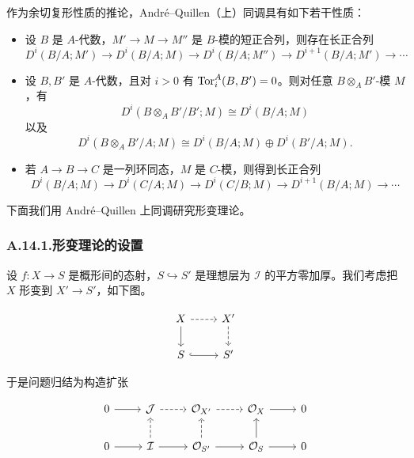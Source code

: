 %

作为余切复形性质的推论，André--Quillen（上）同调具有如下若干性质：

\begin{itemize}
\item 设 $B$ 是 $A$-代数，$M'\to M\to M''$ 是 $B$-模的短正合列，则存在长正合列
\[
D^i(B/A;M')\to D^i(B/A;M)\to D^i(B/A;M'')\to D^{i+1}(B/A;M')\to\cdots
\]
\item 设 $B,B'$ 是 $A$-代数，且对 $i>0$ 有 $\operatorname{Tor}_i^A(B,B')=0$。则对任意 $B\otimes_A B'$-模 $M$，有
\[
D^i(B\otimes_A B'/B';M)\cong D^i(B/A;M)
\]
以及
\[
D^i(B\otimes_A B'/A;M)\cong D^i(B/A;M)\oplus D^i(B'/A;M).
\]
\item 若 $A\to B\to C$ 是一列环同态，$M$ 是 $C$-模，则得到长正合列
\[
D^i(B/A;M)\to D^i(C/A;M)\to D^i(C/B;M)\to D^{i+1}(B/A;M)\to\cdots
\]
\end{itemize}

下面我们用 André--Quillen 上同调研究形变理论。

\subsubsection*{A.14.1.\quad 形变理论的设置}

设 $f\colon X\to S$ 是概形间的态射，$S\hookrightarrow S'$ 是理想层为 $\mathcal I$ 的平方零加厚。我们考虑把 $X$ 形变到 $X'\to S'$，如下图。

\[
\begin{tikzcd}
X \arrow[r, dashed] \arrow[d] & X' \arrow[d, dashed] \\
S \arrow[r, hook] & S'
\end{tikzcd}
\]

于是问题归结为构造扩张

\[
\begin{tikzcd}
0 \arrow[r] & \mathcal J \arrow[r, dashed] & \OO_{X'} \arrow[r, dashed] & \OO_X \arrow[r] & 0 \\
0 \arrow[r] & \mathcal I \arrow[r] \arrow[u, dashed] & \OO_{S'} \arrow[r] \arrow[u, dashed] & \OO_S \arrow[r] \arrow[u] & 0
\end{tikzcd}
\]

